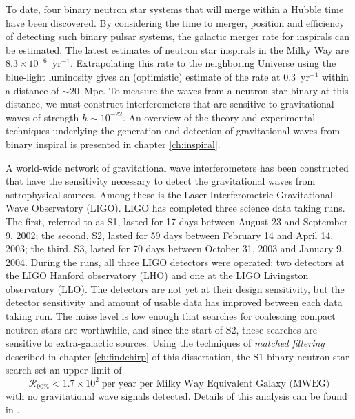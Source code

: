 To date, four binary neutron star systems that will merge within a Hubble time
have been discovered.   By considering the time to merger, position and
efficiency of detecting such binary pulsar systems, the galactic merger rate
for inspirals can be estimated\cite{Phinney:1991ei}.  The latest estimates of
neutron star inspirals in the Milky Way are $8.3 \times 10^{-6}$~yr$^{-1}$. 
Extrapolating this rate to the neighboring Universe using the
blue-light luminosity gives an (optimistic) estimate of the rate at
$0.3$~yr$^{-1}$ within a distance of $\sim 20$~Mpc.  To measure the waves from
a neutron star binary at this distance,  we must construct
interferometers that are sensitive to gravitational waves of strength $h \sim
10^{-22}$. An overview of the theory and experimental techniques underlying
the generation and detection of gravitational waves from binary inspiral is
presented in chapter \ref{ch:inspiral}.

A world-wide network of gravitational wave interferometers has been
constructed that have the sensitivity necessary to detect the gravitational
waves from astrophysical sources. Among these is the Laser Interferometric
Gravitational Wave Observatory (LIGO)\cite{Barish:1999}. LIGO has completed
three science data taking runs. The first, referred to as S1, lasted for 17
days between August 23 and September 9, 2002; the second, S2, lasted for 59
days between February 14 and April 14, 2003; the third, S3, lasted for 70 days
between October 31, 2003 and January 9, 2004.  During the runs, all three LIGO
detectors were operated: two detectors at the LIGO Hanford observatory (LHO)
and one at the LIGO Livingston observatory (LLO).  The detectors are not yet
at their design sensitivity, but the detector sensitivity and amount of
usable data has improved between each data taking run. The noise level is low
enough that searches for coalescing compact neutron stars are worthwhile, and
since the start of S2, these searches are sensitive to extra-galactic sources.
Using the techniques of \emph{matched filtering} described in chapter
\ref{ch:findchirp} of this dissertation, the S1 binary neutron star search set
an upper limit of
\begin{equation}
\mathcal{R}_{90\%} < 1.7 \times 10^2 \;\textrm{per year per Milky Way Equivalent Galaxy (MWEG)}
\end{equation}
with no gravitational wave signals detected. Details of this analysis can be
found in \cite{LIGOS1iul}. 

